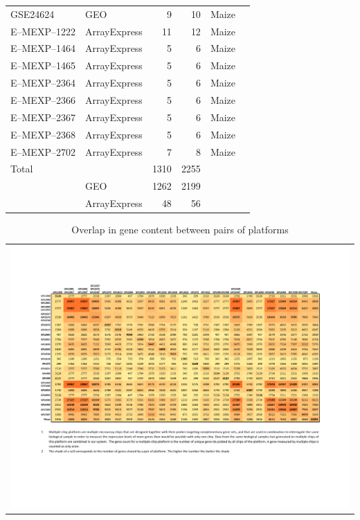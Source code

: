 \begin{ThreePartTable}
\begin{footnotesize}
\begin{longtable}{@{}|>{\centering\arraybackslash}p{2.5cm} | 
>{\centering\arraybackslash}p{1.5cm} rr 
>{\scriptsize\raggedright}p{2.5cm} c |@{}}
GSE24624 & GEO & 9 & 10 & Maize\tnote{2} & \\
E--MEXP--1222 & ArrayExpress & 11 & 12 & Maize\tnote{2} & \\
E--MEXP--1464 & ArrayExpress & 5 & 6 & Maize\tnote{2} & \\
E--MEXP--1465 & ArrayExpress & 5 & 6 & Maize\tnote{2} & \\
E--MEXP--2364 & ArrayExpress & 5 & 6 & Maize\tnote{2} & \\
E--MEXP--2366 & ArrayExpress & 5 & 6 & Maize\tnote{2} & \\
E--MEXP--2367 & ArrayExpress & 5 & 6 & Maize\tnote{2} & \\
E--MEXP--2368 & ArrayExpress & 5 & 6 & Maize\tnote{2} & \\
E--MEXP--2702 & ArrayExpress & 7 & 8 & Maize\tnote{2} & \\
\midrule
Total & & 1310 & 2255 & & \\ \hline
& GEO & 1262 & 2199 & & \\ 
& ArrayExpress & 48 & 56 && \\
\bottomrule
\end{longtable}
\end{footnotesize}
\end{ThreePartTable}



\begin{table}
	\centering
	\caption{Overlap in gene content between pairs of platforms}
	\label{tab:maize-platform-overlap}
	\begin{tabular}{c}
	\includegraphics[trim=2cm 2cm 2cm 2cm, clip=true, width=1\textwidth] 	
		{ApdxB-overlap-TB.pdf} \\
	\end{tabular}
\end{table}


